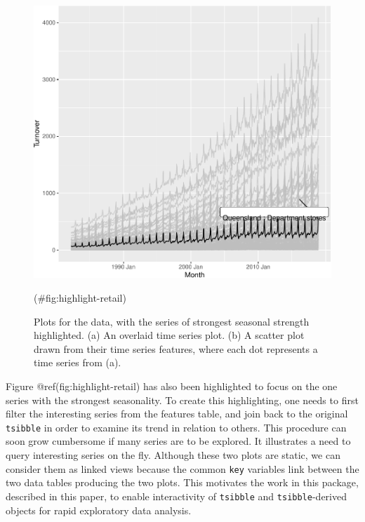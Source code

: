 \begin{Schunk}
\begin{figure}

{\centering \includegraphics[width=\textwidth]{figure/highlight-retail-1} 

}

\caption[Plots for the  data, with the series of strongest seasonal strength highlighted]{Plots for the  data, with the series of strongest seasonal strength highlighted. (a) An overlaid time series plot. (b) A scatter plot drawn from their time series features, where each dot represents a time series from (a).}(\#fig:highlight-retail)
\end{figure}
\end{Schunk}

Figure @ref(fig:highlight-retail) has also been highlighted to focus on
the one series with the strongest seasonality. To create this
highlighting, one needs to first filter the interesting series from the
features table, and join back to the original \texttt{tsibble} in order
to examine its trend in relation to others. This procedure can soon grow
cumbersome if many series are to be explored. It illustrates a need to
query interesting series on the fly. Although these two plots are
static, we can consider them as linked views because the common
\texttt{key} variables link between the two data tables producing the
two plots. This motivates the work in this package, described in this
paper, to enable interactivity of \texttt{tsibble} and
\texttt{tsibble}-derived objects for rapid exploratory data analysis.

